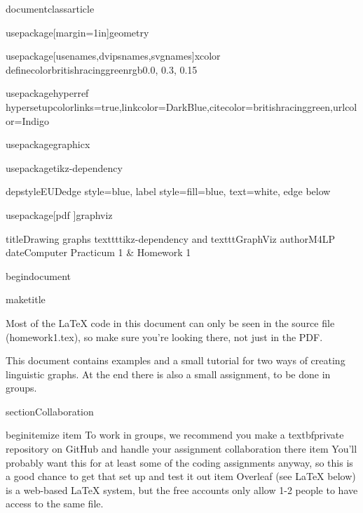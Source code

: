 documentclass{article}


usepackage[margin=1in]{geometry}

usepackage[usenames,dvipsnames,svgnames]{xcolor}
definecolor{britishracinggreen}{rgb}{0.0, 0.3, 0.15}


usepackage{hyperref}
hypersetup{colorlinks=true,linkcolor=DarkBlue,citecolor=britishracinggreen,urlcolor=Indigo}



usepackage{graphicx}

usepackage{tikz-dependency}

depstyle{EUD}{edge style={blue}, label style={fill=blue, text=white}, edge below}



usepackage[pdf %
]{graphviz}

title{Drawing graphs texttt{tikz-dependency} and texttt{GraphViz}}
author{M4LP}
date{Computer Practicum 1 & Homework 1}


begin{document}

maketitle

Most of the LaTeX{} code in this document can only be seen in the source file (homework1.tex), so make sure you're looking there, not just in the PDF.

This document contains examples and a small tutorial for two ways of creating linguistic graphs. At the end there is also a small assignment, to be done in groups.

section{Collaboration}

begin{itemize}
item To work in groups, we recommend you make a textbf{private repository} on GitHub and handle your assignment collaboration there
item You'll probably want this for at least some of the coding assignments anyway, so this is a good chance to get that set up and test it out
item Overleaf (see LaTeX{} below) is a web-based LaTeX{} system, but the free accounts only allow 1-2 people to have access to the same file. 

